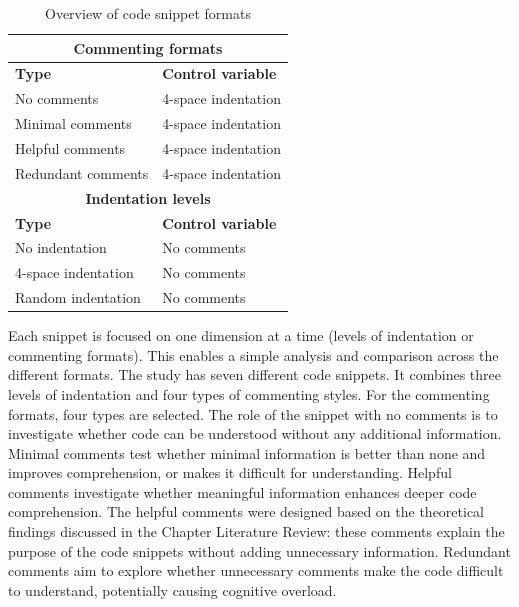 \begin{table}[ht]
\centering
\small
\caption{Overview of code snippet formats}
\begin{tabular}{|p{6cm}|p{6cm}|}
\hline
\multicolumn{2}{|c|}{\rule{0pt}{1.2em}\textbf{Commenting formats}} \\[0.5em]
\hline
\rule{0pt}{1.2em}\textbf{Type} & \textbf{Control variable} \\[0.5em]
\hline 
\rule{0pt}{1.2em}No comments & 4-space indentation \\[0.5em]
\hline
\rule{0pt}{1.2em}Minimal comments & 4-space indentation \\[0.5em]
\hline
\rule{0pt}{1.2em}Helpful comments & 4-space indentation \\[0.5em]
\hline
\rule{0pt}{1.2em}Redundant comments & 4-space indentation \\[0.5em]
\hline
\multicolumn{2}{|c|}{\rule{0pt}{1.2em}\textbf{Indentation levels}} \\[0.5em]
\hline
\rule{0pt}{1.2em}\textbf{Type} & \textbf{Control variable} \\[0.5em]
\hline
\rule{0pt}{1.2em}No indentation & No comments \\[0.5em]
\hline
\rule{0pt}{1.2em}4-space indentation & No comments \\[0.5em]
\hline
\rule{0pt}{1.2em}Random indentation & No comments \\[0.5em]
\hline
\end{tabular}
\label{tab:snippet_control}
\end{table}



Each snippet is focused on one dimension at a time (levels of indentation or commenting formats). This enables a simple analysis and comparison across the different formats. The study has seven different code snippets. It combines three levels of indentation and four types of commenting styles. For the commenting formats, four types are selected.  The role of the snippet with no comments is to investigate whether code can be understood without any additional information.  Minimal comments test whether minimal information is better than none and improves comprehension, or makes it difficult for understanding.
Helpful comments investigate whether meaningful information enhances deeper code comprehension. The helpful comments were designed based on the theoretical findings discussed in the Chapter Literature Review: these comments explain the purpose of the code snippets without adding unnecessary information. Redundant comments aim to explore whether unnecessary comments make the code difficult to understand, potentially causing cognitive overload.



